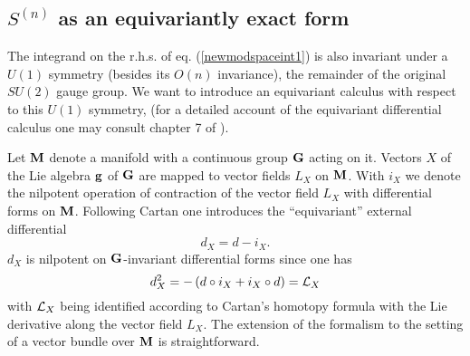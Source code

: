 \documentclass[a4paper,12pt]{article}
\begin{document}
\subsection{$S^{(n)}$ as an equivariantly exact form}

The integrand on the r.h.s. of eq. (\ref{newmodspaceint1}) is also 
invariant under a $U(1)$ symmetry (besides its $O(n)$ invariance), 
the remainder of the original $SU(2)$ gauge group. We want to introduce 
an equivariant calculus with respect to this $U(1)$ symmetry, (for a 
detailed account of the equivariant differential calculus one may 
consult chapter 7 of \cite{berline}). 

Let ${\bf M}$ denote a manifold with a continuous group ${\bf G}$ 
acting on it. Vectors $X$ of the Lie algebra ${\bf g}$ of ${\bf G}$ 
are mapped to vector fields $L_X$ on ${\bf M}$. With $i_X$ we denote the 
nilpotent operation of contraction of the vector field $L_X$ with 
differential forms on  ${\bf M}$. Following Cartan \cite{cartan} 
one introduces the ``equivariant'' external differential 
\begin{equation}
d_X =d-i_X.
\label{equivdiff}
\end{equation}
$d_X$ is nilpotent on ${\bf G}$-invariant differential forms since 
one has 
\begin{equation}
d_X^2 =-\left(d \circ i_X + i_X \circ d \right)={\cal L}_X  
\end{equation}             
with ${\cal L}_X$ being identified according to Cartan's homotopy 
formula with the Lie derivative along the vector field $L_X$. The 
extension of the formalism to the setting of a vector bundle over 
${\bf M}$ is straightforward. 
\end{document}
